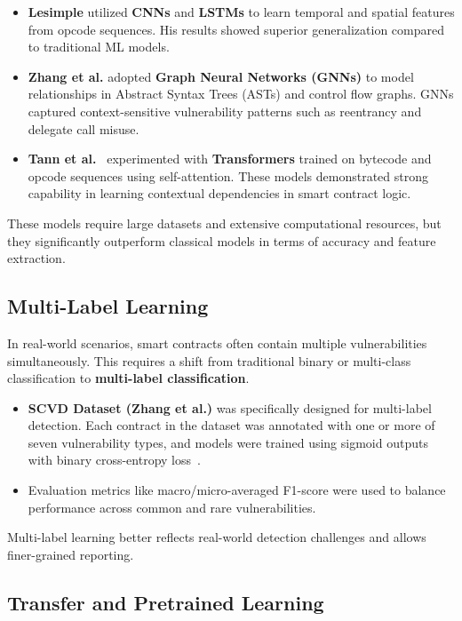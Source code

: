\begin{itemize}
    \item \textbf{Lesimple} utilized \textbf{CNNs} and \textbf{LSTMs} to learn temporal and spatial features from opcode sequences. His results showed superior generalization compared to traditional ML models.
    
    \item \textbf{Zhang et al.} adopted \textbf{Graph Neural Networks (GNNs)} to model relationships in Abstract Syntax Trees (ASTs) and control flow graphs. GNNs captured context-sensitive vulnerability patterns such as reentrancy and delegate call misuse.
    
    \item \textbf{Tann et al.}~\cite{tann2020towards} experimented with \textbf{Transformers} trained on bytecode and opcode sequences using self-attention. These models demonstrated strong capability in learning contextual dependencies in smart contract logic.
\end{itemize}

These models require large datasets and extensive computational resources, but they significantly outperform classical models in terms of accuracy and feature extraction.
\subsection*{Multi-Label Learning}

In real-world scenarios, smart contracts often contain multiple vulnerabilities simultaneously. This requires a shift from traditional binary or multi-class classification to \textbf{multi-label classification}.

\begin{itemize}
    \item \textbf{SCVD Dataset (Zhang et al.)} was specifically designed for multi-label detection. Each contract in the dataset was annotated with one or more of seven vulnerability types, and models were trained using sigmoid outputs with binary cross-entropy loss~\cite{zhang2020scvd}.
    
    \item Evaluation metrics like macro/micro-averaged F1-score were used to balance performance across common and rare vulnerabilities.
\end{itemize}

Multi-label learning better reflects real-world detection challenges and allows finer-grained reporting.

\subsection*{Transfer and Pretrained Learning}

